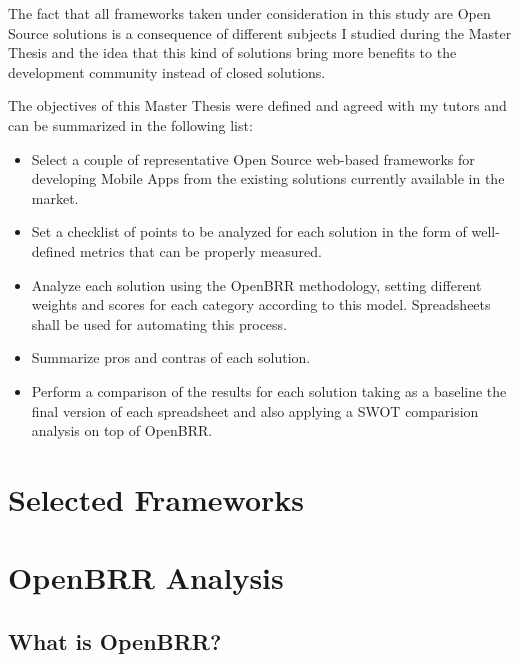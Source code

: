 \documentclass[a4paper,12pt]{book}
\begin{document}

The fact that all frameworks taken under consideration in this study are Open Source solutions is a consequence of different subjects I studied during the Master Thesis and the idea that this kind of solutions bring more benefits to the development community instead of closed solutions.

The objectives of this Master Thesis were defined and agreed with my tutors and can be summarized in the following list:

\begin{itemize}
\item Select a couple of representative Open Source web-based frameworks for developing Mobile Apps from the existing solutions currently available in the market.
\item Set a checklist of points to be analyzed for each solution in the form of well-defined metrics that can be properly measured.
\item Analyze each solution using the OpenBRR methodology, setting different weights and scores for each category according to this model. Spreadsheets shall be used for automating this process.
\item Summarize pros and contras of each solution.
\item Perform a comparison of the results for each solution taking as a baseline the final version of each spreadsheet and also applying a SWOT comparision analysis on top of OpenBRR.
\end{itemize}


\chapter{Selected Frameworks}
\label{chap:overview}




\chapter{OpenBRR Analysis}
\label{chap:openbrr}

\section{What is OpenBRR?}
\label{sec:openbrr2}
\end{document}
